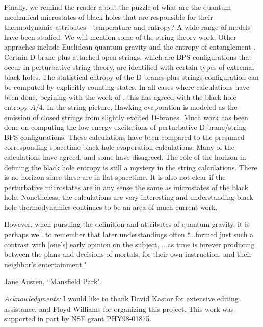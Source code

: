 \documentclass[12pt]{article}
\begin{document}
Finally, we remind the reader about the puzzle of what are the quantum
mechanical
microstates of black holes that are responsible for their thermodynamic
attributes -
temperature and entropy? A wide range of models have been studied. We will
mention some of
the string theory work. Other appraches include Euclidean quantum gravity
\cite{gh}
 and the entropy of entanglement \cite{bombelli}.
Certain D-brane plus attached open
strings, which are BPS configurations that occur in perturbative string
theory, are
identified with certain types of extremal black holes. The statistical
entropy of
the D-branes plus strings configuration can be computed by explicitly
counting states. In all
cases  where calculations have been done, begining with the work of
\cite{stromvafa}, this has
agreed with the black hole entropy  $A/4$. In the string
picture, Hawking evaporation is modeled as the emission of closed strings
from slightly excited D-branes.  Much work has been
done on computing the low energy excitations of perturbative
D-brane/string BPS configurations. These calculations have been compared
to the presumed corresponding spacetime  black hole evaporation calculations.
Many of the calculations have agreed, and some have
disagreed.
The role of the horizon in defining the black hole entropy is still
a mystery in the string calculations. There is no horizon since these are in
flat spacetime. It is also not clear if the perturbative microstates are in any
sense the same as microstates of the black hole. Nonetheless,
the calculations are very interesting and
understanding black hole thermodynamics continues to be an
area of much current work.

However, when pursuing the definition and attributes of quantum gravity, it is
perhaps well to remember that later understandings often ``...formed just
such  a
contrast with [one's] early opinion on the subject, ...as time is forever
producing
between the plans and decisions of mortals, for their own instruction, and
their neighbor's entertainment." \begin{footnote}{Jane Austen, ``Mansfield
Park".}\end{footnote}

\vskip 0.1in\noindent
{\it Acknowledgments:}
\vskip 0.05in
I would like to thank David Kastor for extensive editing assistance, and Floyd
Williams for organizing this project. This work was supported in part by
NSF grant
PHY98-01875.
\end{document}
